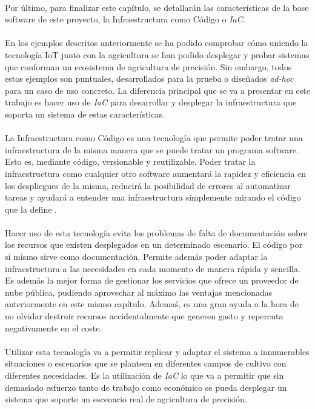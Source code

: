 \documentclass[../../memoria.tex]{subfiles}
\begin{document}
\paragraph{}
Por último, para finalizar este capítulo, se detallarán las características de la base software de este proyecto, la Infraestructura como Código o \textit{IaC}.

\paragraph{}
En los ejemplos descritos anteriormente se ha podido comprobar cómo uniendo la tecnología IoT junto con la agricultura se han podido desplegar y probar sistemas que conforman un ecosistema de agricultura de precisión. Sin embargo, todos estos ejemplos son puntuales, desarrollados para la prueba o diseñados \textit{ad-hoc} para un caso de uso concreto. La diferencia principal que se va a presentar en este trabajo es hacer uso de \textit{IaC} para desarrollar y desplegar la infraestructura que soporta un sistema de estas características.

\paragraph{}
La Infraestructura como Código es una tecnología que permite poder tratar una infraestructura de la misma manera que se puede tratar un programa software. Esto es, mediante código, versionable y reutilizable. Poder tratar la infraestructura como cualquier otro software aumentará la rapidez y eficiencia en los despliegues de la misma, reducirá la posibilidad de errores al automatizar tareas y ayudará a entender una infraestructura simplemente mirando el código que la define \cite{iac}\cite{iac2}\cite{iac3}.

\paragraph{}
Hacer uso de esta tecnología evita los problemas de falta de documentación sobre los recursos que existen desplegados en un determinado escenario. El código por sí mismo sirve como documentación. Permite además poder adaptar la infraestructura a las necesidades en cada momento de manera rápida y sencilla. Es además la mejor forma de gestionar los servicios que ofrece un proveedor de nube pública, pudiendo aprovechar al máximo las ventajas mencionadas anteriormente en este mismo capítulo. Ademaś, es una gran ayuda a la hora de no olvidar destruir recursos accidentalmente que generen gasto y repercuta negativamente en el coste.

\paragraph{}
Utilizar esta tecnología va a permitir replicar y adaptar el sistema a innumerables situaciones o escenarios que se planteen en diferentes campos de cultivo con diferentes necesidades. Es la utilización de \textit{IaC} lo que va a permitir que sin demasiado esfuerzo tanto de trabajo como económico se pueda desplegar un sistema que soporte un escenario real de agricultura de precisión.
\end{document}
